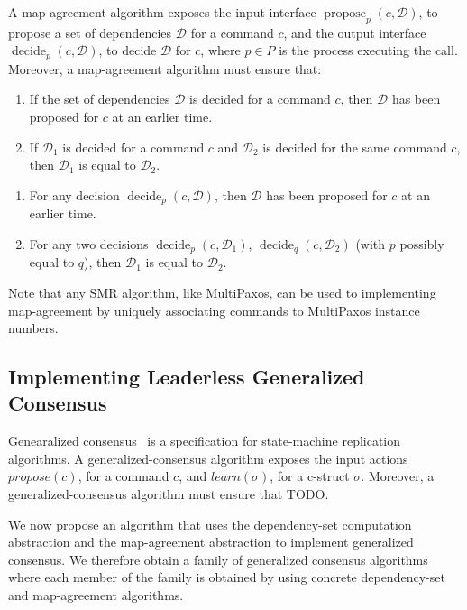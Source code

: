 A map-agreement algorithm exposes the input interface $\operatorname{propose}_p\left( c, \mathcal{D} \right)$, to propose a set of dependencies $\mathcal{D}$ for a command $c$, and the output interface $\operatorname{decide}_p\left( c, \mathcal{D} \right)$, to decide $\mathcal{D}$ for $c$, where $p\in P$ is the process executing the call.
Moreover, a map-agreement algorithm must ensure that: 
\begin{enumerate}
    \item If the set of dependencies $\mathcal{D}$ is decided for a command $c$, then $\mathcal{D}$ has been proposed for $c$ at an earlier time.
    \item If $\mathcal{D}_1$ is decided for a command $c$ and $\mathcal{D}_2$ is decided for the same command $c$, then $\mathcal{D}_1$ is equal to $\mathcal{D}_2$.
 \end{enumerate}


\begin{enumerate}
    \item For any decision $\operatorname{decide}_p\left( c, \mathcal{D} \right)$, then $\mathcal{D}$ has been proposed for $c$ at an earlier time.
    \item For any two decisions $\operatorname{decide}_p\left( c, \mathcal{D}_1 \right)$, $\operatorname{decide}_q\left( c, \mathcal{D}_2 \right)$ (with $p$ possibly equal to $q$), then $\mathcal{D}_1$ is equal to $\mathcal{D}_2$.


\end{enumerate}

Note that any SMR algorithm, like MultiPaxos, can be used to implementing map-agreement by uniquely associating commands to MultiPaxos instance numbers.

\subsection{Implementing Leaderless Generalized Consensus}

Genearalized consensus~\cite{Lamport05GeneralizeConsensus} is a specification for state-machine replication algorithms. 
A generalized-consensus algorithm exposes the input actions $propose\left( c \right)$, for a command $c$, and $learn\left( \sigma \right)$, for a c-struct $\sigma$.
Moreover, a generalized-consensus algorithm must ensure that TODO.

We now propose an algorithm that uses the dependency-set computation abstraction and the map-agreement abstraction to implement generalized consensus. We therefore obtain a family of generalized consensus algorithms where each member of the family is obtained by using concrete dependency-set and map-agreement algorithms.

